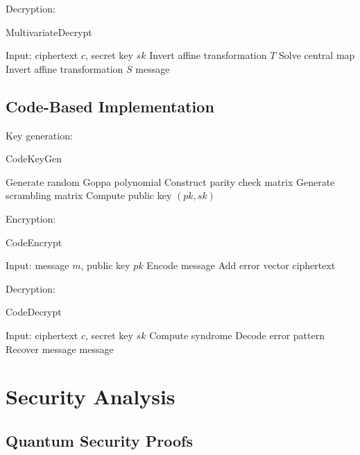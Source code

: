 \documentclass[12pt]{article}
\begin{document}
Decryption:

\begin{algorithm}
\caption{MultivariateDecrypt}
\begin{algorithmic}[1]
\STATE Input: ciphertext $c$, secret key $sk$
\STATE Invert affine transformation $T$
\STATE Solve central map
\STATE Invert affine transformation $S$
\RETURN message
\end{algorithmic}
\end{algorithm}

\subsection{Code-Based Implementation}

Key generation:

\begin{algorithm}
\caption{CodeKeyGen}
\begin{algorithmic}[1]
\STATE Generate random Goppa polynomial
\STATE Construct parity check matrix
\STATE Generate scrambling matrix
\STATE Compute public key
\RETURN $(pk, sk)$
\end{algorithmic}
\end{algorithm}

Encryption:

\begin{algorithm}
\caption{CodeEncrypt}
\begin{algorithmic}[1]
\STATE Input: message $m$, public key $pk$
\STATE Encode message
\STATE Add error vector
\RETURN ciphertext
\end{algorithmic}
\end{algorithm}

Decryption:

\begin{algorithm}
\caption{CodeDecrypt}
\begin{algorithmic}[1]
\STATE Input: ciphertext $c$, secret key $sk$
\STATE Compute syndrome
\STATE Decode error pattern
\STATE Recover message
\RETURN message
\end{algorithmic}
\end{algorithm}

\section{Security Analysis}

\subsection{Quantum Security Proofs}
\end{document}
